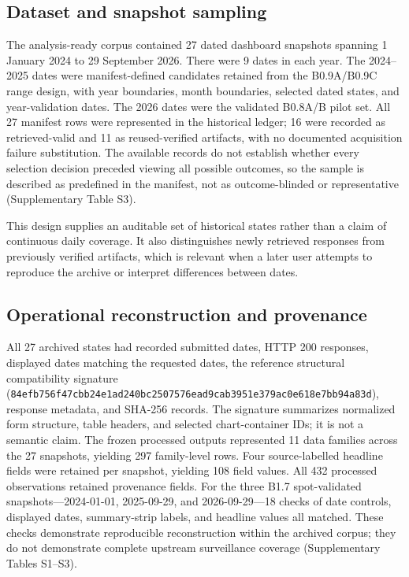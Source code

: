 \subsection{Dataset and snapshot sampling}

The analysis-ready corpus contained 27 dated dashboard snapshots spanning 1 January 2024 to 29 September 2026. There were 9 dates in each year. The 2024--2025 dates were manifest-defined candidates retained from the B0.9A/B0.9C range design, with year boundaries, month boundaries, selected dated states, and year-validation dates. The 2026 dates were the validated B0.8A/B pilot set. All 27 manifest rows were represented in the historical ledger; 16 were recorded as retrieved-valid and 11 as reused-verified artifacts, with no documented acquisition failure substitution. The available records do not establish whether every selection decision preceded viewing all possible outcomes, so the sample is described as predefined in the manifest, not as outcome-blinded or representative (Supplementary Table S3).

This design supplies an auditable set of historical states rather than a claim of continuous daily coverage. It also distinguishes newly retrieved responses from previously verified artifacts, which is relevant when a later user attempts to reproduce the archive or interpret differences between dates.

\subsection{Operational reconstruction and provenance}

All 27 archived states had recorded submitted dates, HTTP 200 responses, displayed dates matching the requested dates, the reference structural compatibility signature (\texttt{84efb756f47cbb24e1ad240bc2507576ead9cab3951e379ac0e618e7bb94a83d}), response metadata, and SHA-256 records. The signature summarizes normalized form structure, table headers, and selected chart-container IDs; it is not a semantic claim. The frozen processed outputs represented 11 data families across the 27 snapshots, yielding 297 family-level rows. Four source-labelled headline fields were retained per snapshot, yielding 108 field values. All 432 processed observations retained provenance fields. For the three B1.7 spot-validated snapshots---2024-01-01, 2025-09-29, and 2026-09-29---18 checks of date controls, displayed dates, summary-strip labels, and headline values all matched. These checks demonstrate reproducible reconstruction within the archived corpus; they do not demonstrate complete upstream surveillance coverage (Supplementary Tables S1--S3).

